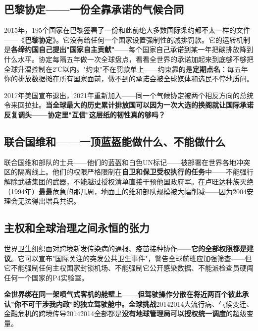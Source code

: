 \documentclass[a4paper,12pt]{ctexart}
\begin{document}
\subsection*{巴黎协定——一份全靠承诺的气候合同}

2015年，195个国家在巴黎签署了一份和此前绝大多数国际条约都不太一样的文件——《\textbf{巴黎协定}》。它没有给任何一个国家设置强制性的减排罚款。它的运转机制是\textbf{各缔约国自己提出"国家自主贡献"}——每个国家自己承诺到某一年把碳排放降到什么水平。协定每隔五年做一次全球盘点，看看全世界的承诺加起来到底够不够把全球升温控制在2℃以内。"约束"不在罚款单上——约束靠的是\textbf{定期点名}：每五年你的排放数据摊在所有国家面前，做不到的承诺会被全球媒体和选民不停地质问。

2017年美国宣布退出，2021年重新加入——同一个气候协定被两个相反方向的总统令来回拉扯。\textbf{当全球最大的历史累计排放国可以因为一次大选的换阁就让国际承诺反复调头——协定里"互信"这层纸的韧性真的够吗？}

\subsection*{联合国维和——一顶蓝盔能做什么、不能做什么}

联合国维和部队的士兵——他们的蓝盔和白色UN标记——被部署在世界各地冲突区的隔离线上。他们的权限严格限制在\textbf{自卫和保卫受权执行的任务}中——不能强行解除武装集团的武器，不能越过授权清单直接干预他国政府军。在卢旺达种族灭绝（1994年）最最危急的那几周，地面上的维和部队规模被大幅削减——因为\u2004安理会无法得出增兵共识。\:

\subsection*{主权和全球治理之间永恒的张力}

世界卫生组织面对跨境新发传染病的通报、疫苗接种协作——\textbf{它的全部权限都是建议}。它可以宣布"国际关注的突发公共卫生事件"，警告全球航班应加强筛查——但它不能强制任何主权国家封锁机场、不能强制它公开感染数据、不能派检查员硬闯任何一个国家的P4实验室。

\textbf{全世界绑在同一架喷气式客机的舱壁上——但驾驶操作分散在将近两百个彼此承认"你不可干涉我内政"的独立驾驶舱中。}\:\textbf{全球挑战}\u2014\u2014大流行病、气候变迁、金融危机的跨境传导\u2014\u2014全部都是\textbf{没有地球管理局可以授权统一调度}的超级变量。
\end{document}
